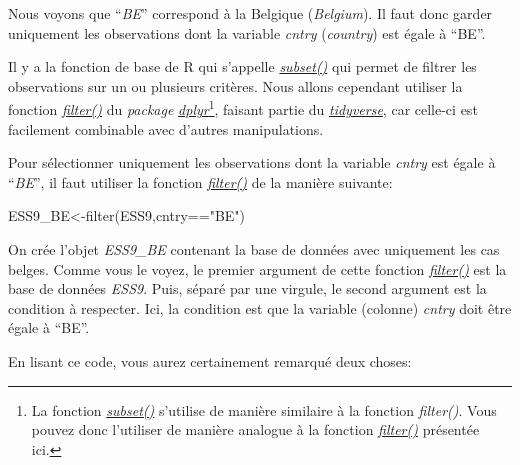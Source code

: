 \documentclass[
]{book}
\newenvironment{Shaded}{\begin{snugshade}}{\end{snugshade}}
\newcommand{\FunctionTok}[1]{\textcolor[rgb]{0.00,0.00,0.00}{#1}}
\newcommand{\NormalTok}[1]{#1}
\newcommand{\OtherTok}[1]{\textcolor[rgb]{0.56,0.35,0.01}{#1}}
\newcommand{\SpecialCharTok}[1]{\textcolor[rgb]{0.00,0.00,0.00}{#1}}
\newcommand{\StringTok}[1]{\textcolor[rgb]{0.31,0.60,0.02}{#1}}
\begin{document}
Nous voyons que ``\emph{BE}'' correspond à la Belgique (\emph{Belgium}). Il faut donc garder uniquement les observations dont la variable \emph{cntry} (\emph{country}) est égale à ``BE''.

Il y a la fonction de base de R qui s'appelle \href{https://www.rdocumentation.org/packages/base/versions/3.6.2/topics/subset}{\emph{subset()}} qui permet de filtrer les observations sur un ou plusieurs critères. Nous allons cependant utiliser la fonction \href{https://dplyr.tidyverse.org/reference/filter.html}{\emph{filter()}} du \emph{package} \href{https://dplyr.tidyverse.org/}{\emph{dplyr}}\footnote{La fonction \href{https://www.rdocumentation.org/packages/base/versions/3.6.2/topics/subset}{\emph{subset()}} s'utilise de manière similaire à la fonction \emph{filter()}. Vous pouvez donc l'utiliser de manière analogue à la fonction \href{https://dplyr.tidyverse.org/reference/filter.html}{\emph{filter()}} présentée ici.}, faisant partie du \href{https://www.tidyverse.org/}{\emph{tidyverse}}, car celle-ci est facilement combinable avec d'autres manipulations.

Pour sélectionner uniquement les observations dont la variable \emph{cntry} est égale à ``\emph{BE}'', il faut utiliser la fonction \href{https://dplyr.tidyverse.org/reference/filter.html}{\emph{filter()}} de la manière suivante:

\begin{Shaded}
\begin{Highlighting}[]
\NormalTok{ESS9\_BE}\OtherTok{\textless{}{-}}\FunctionTok{filter}\NormalTok{(ESS9,cntry}\SpecialCharTok{==}\StringTok{"BE"}\NormalTok{)}
\end{Highlighting}
\end{Shaded}

On crée l'objet \emph{ESS9\_BE} contenant la base de données avec uniquement les cas belges. Comme vous le voyez, le premier argument de cette fonction \href{https://dplyr.tidyverse.org/reference/filter.html}{\emph{filter()}} est la base de données \emph{ESS9}. Puis, séparé par une virgule, le second argument est la condition à respecter. Ici, la condition est que la variable (colonne) \emph{cntry} doit être égale à ``BE''.

En lisant ce code, vous aurez certainement remarqué deux choses:
\end{document}
